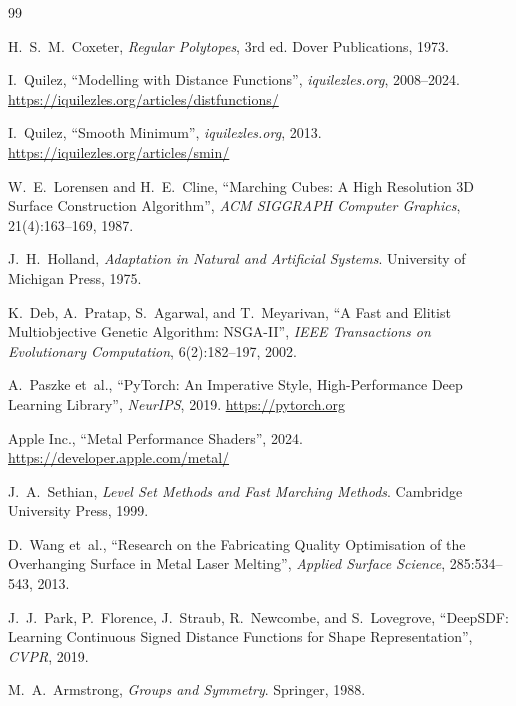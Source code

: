 \documentclass[11pt, a4paper]{article}
\begin{document}
\begin{thebibliography}{99}

H.~S.~M.\ Coxeter,
\textit{Regular Polytopes}, 3rd ed.
Dover Publications, 1973.

I.~Quilez,
``Modelling with Distance Functions'',
\textit{iquilezles.org}, 2008--2024.
\url{https://iquilezles.org/articles/distfunctions/}

I.~Quilez,
``Smooth Minimum'',
\textit{iquilezles.org}, 2013.
\url{https://iquilezles.org/articles/smin/}

W.~E.\ Lorensen and H.~E.\ Cline,
``Marching Cubes: A High Resolution 3D Surface Construction Algorithm'',
\textit{ACM SIGGRAPH Computer Graphics}, 21(4):163--169, 1987.

J.~H.\ Holland,
\textit{Adaptation in Natural and Artificial Systems}.
University of Michigan Press, 1975.

K.~Deb, A.~Pratap, S.~Agarwal, and T.~Meyarivan,
``A Fast and Elitist Multiobjective Genetic Algorithm: NSGA-II'',
\textit{IEEE Transactions on Evolutionary Computation}, 6(2):182--197, 2002.

A.~Paszke et~al.,
``PyTorch: An Imperative Style, High-Performance Deep Learning Library'',
\textit{NeurIPS}, 2019.
\url{https://pytorch.org}

Apple Inc.,
``Metal Performance Shaders'', 2024.
\url{https://developer.apple.com/metal/}

J.~A.\ Sethian,
\textit{Level Set Methods and Fast Marching Methods}.
Cambridge University Press, 1999.

D.\ Wang et~al.,
``Research on the Fabricating Quality Optimisation of the Overhanging
Surface in Metal Laser Melting'',
\textit{Applied Surface Science}, 285:534--543, 2013.

J.~J.\ Park, P.~Florence, J.~Straub, R.~Newcombe, and S.~Lovegrove,
``DeepSDF: Learning Continuous Signed Distance Functions for Shape
Representation'',
\textit{CVPR}, 2019.

M.~A.\ Armstrong,
\textit{Groups and Symmetry}.
Springer, 1988.

\end{thebibliography}
\end{document}
